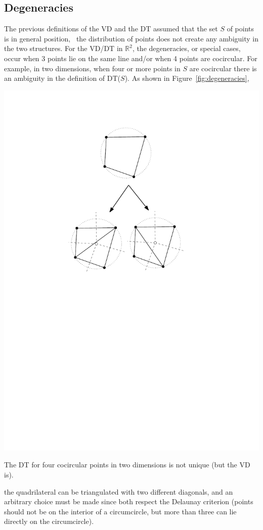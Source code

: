 %
\subsection{Degeneracies}%
\label{sec:degeneracies}

The previous definitions of the VD and the DT assumed that the set $S$ of points is in general position, \ie\ the distribution of points does not create any ambiguity in the two structures. 
For the VD/DT in $\mathbb{R}^{2}$, the degeneracies, or special cases, occur when 3 points lie on the same line and/or when 4 points are cocircular. 
For example, in two dimensions, when four or more points in $S$ are cocircular there is an ambiguity in the definition of DT($S$). 
As shown in Figure~\ref{fig:degeneracies},
\begin{marginfigure}
  \centering
  \includegraphics[width=\textwidth]{figs/degeneracies}
  \caption{The DT for four cocircular points in two dimensions is not unique (but the VD is).}%
\label{fig:degeneracies}
\end{marginfigure}
the quadrilateral can be triangulated with two different diagonals, and an arbitrary choice must be made since both respect the Delaunay criterion (points should not be on the interior of a circumcircle, but more than three can lie directly on the circumcircle).

